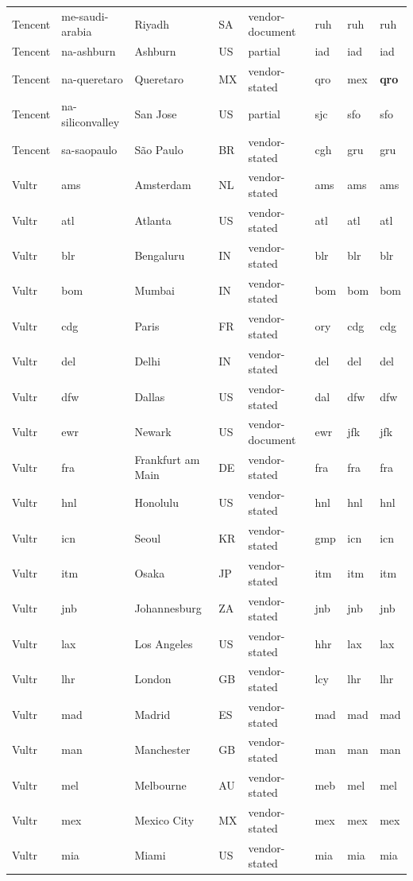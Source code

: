 \begin{longtable}{llllllll}
Tencent & me-saudi-arabia & Riyadh & SA & vendor-document & ruh & ruh & ruh \\
Tencent & na-ashburn & Ashburn & US & partial & iad & iad & iad \\
Tencent & na-queretaro & Queretaro & MX & vendor-stated & qro & mex & \textbf{qro} \\
Tencent & na-siliconvalley & San Jose & US & partial & sjc & sfo & sfo \\
Tencent & sa-saopaulo & São Paulo & BR & vendor-stated & cgh & gru & gru \\
Vultr & ams & Amsterdam & NL & vendor-stated & ams & ams & ams \\
Vultr & atl & Atlanta & US & vendor-stated & atl & atl & atl \\
Vultr & blr & Bengaluru & IN & vendor-stated & blr & blr & blr \\
Vultr & bom & Mumbai & IN & vendor-stated & bom & bom & bom \\
Vultr & cdg & Paris & FR & vendor-stated & ory & cdg & cdg \\
Vultr & del & Delhi & IN & vendor-stated & del & del & del \\
Vultr & dfw & Dallas & US & vendor-stated & dal & dfw & dfw \\
Vultr & ewr & Newark & US & vendor-document & ewr & jfk & jfk \\
Vultr & fra & Frankfurt am Main & DE & vendor-stated & fra & fra & fra \\
Vultr & hnl & Honolulu & US & vendor-stated & hnl & hnl & hnl \\
Vultr & icn & Seoul & KR & vendor-stated & gmp & icn & icn \\
Vultr & itm & Osaka & JP & vendor-stated & itm & itm & itm \\
Vultr & jnb & Johannesburg & ZA & vendor-stated & jnb & jnb & jnb \\
Vultr & lax & Los Angeles & US & vendor-stated & hhr & lax & lax \\
Vultr & lhr & London & GB & vendor-stated & lcy & lhr & lhr \\
Vultr & mad & Madrid & ES & vendor-stated & mad & mad & mad \\
Vultr & man & Manchester & GB & vendor-stated & man & man & man \\
Vultr & mel & Melbourne & AU & vendor-stated & meb & mel & mel \\
Vultr & mex & Mexico City & MX & vendor-stated & mex & mex & mex \\
Vultr & mia & Miami & US & vendor-stated & mia & mia & mia \\

\end{longtable}
